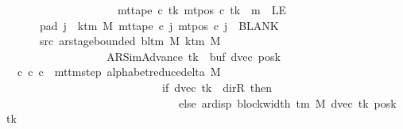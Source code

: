 \begin{isabellebody}
\ \ \ \ \ \ \ \ \ \ \ \ \ \ \ \ \ \ \ \ {\isasymLongrightarrow}\ mt{\isacharunderscore}{\kern0pt}tape\ c{}\ tk\ {\isacharparenleft}{\kern0pt}mt{\isacharunderscore}{\kern0pt}pos\ c{}\ tk\ {\isacharminus}{\kern0pt}\ m{\isacharparenright}{\kern0pt}\ {\isasymnoteq}\ LE{}{\isachardoublequoteclose}\isanewline
\ \ \ \ \ \ \ pad{}{\isacharcolon}{\kern0pt}\ {\isachardoublequoteopen}{\isasymforall}j\ {\isasymge}\ k{\isacharunderscore}{\kern0pt}tm\ M{\isachardot}{\kern0pt}\ mt{\isacharunderscore}{\kern0pt}tape\ c{}\ j\ {\isacharparenleft}{\kern0pt}mt{\isacharunderscore}{\kern0pt}pos\ c{}\ j{\isacharparenright}{\kern0pt}\ {\isacharequal}{\kern0pt}\ BLANK{}{\isachardoublequoteclose}\isanewline
\ \ \ \ \ \ \ src{}{\isacharcolon}{\kern0pt}\ {\isachardoublequoteopen}ar{\isacharunderscore}{\kern0pt}stage{\isacharunderscore}{\kern0pt}bounded\ {\isacharparenleft}{\kern0pt}bl{\isacharunderscore}{\kern0pt}tm\ M{\isacharparenright}{\kern0pt}\ {\isacharparenleft}{\kern0pt}k{\isacharunderscore}{\kern0pt}tm\ M{\isacharparenright}{\kern0pt}\isanewline
\ \ \ \ \ \ \ \ \ \ \ \ \ \ \ \ \ \ \ {\isacharparenleft}{\kern0pt}AR{\isacharunderscore}{\kern0pt}SimAdvance{\isacharcomma}{\kern0pt}\ tk{\isacharcomma}{\kern0pt}\ {}{\isacharcomma}{\kern0pt}\ buf{\isacharcomma}{\kern0pt}\ dvec{\isacharcomma}{\kern0pt}\ posk{\isacharparenright}{\kern0pt}{\isachardoublequoteclose}\isanewline
\ \ \ {\isachardoublequoteopen}{\isasymexists}c{\isacharprime}{\kern0pt}{\isachardot}{\kern0pt}\ {\isacharparenleft}{\kern0pt}c{}{\isacharcomma}{\kern0pt}\ c{\isacharprime}{\kern0pt}{\isacharparenright}{\kern0pt}\ {\isasymin}\ {\isacharparenleft}{\kern0pt}mttm{\isacharunderscore}{\kern0pt}step\ {\isacharparenleft}{\kern0pt}alphabet{\isacharunderscore}{\kern0pt}reduce{\isacharunderscore}{\kern0pt}delta\ M{\isacharparenright}{\kern0pt}{\isacharparenright}{\kern0pt}\isanewline
\ \ \ \ \ \ \ \ \ \ \ \ \ \ \ \ \ \ \ \ \ \ \ \ \ \ \ \ {\isacharcircum}{\kern0pt}{\isacharcircum}{\kern0pt}\ {\isacharparenleft}{\kern0pt}if\ dvec\ tk\ {\isacharequal}{\kern0pt}\ dir{\isachardot}{\kern0pt}R\ then\ {}\isanewline
\ \ \ \ \ \ \ \ \ \ \ \ \ \ \ \ \ \ \ \ \ \ \ \ \ \ \ \ \ \ \ \ else\ ar{\isacharunderscore}{\kern0pt}disp\ {\isacharparenleft}{\kern0pt}block{\isacharunderscore}{\kern0pt}width\ {\isacharparenleft}{\kern0pt}{\isasymGamma}{\isacharunderscore}{\kern0pt}tm\ M{\isacharparenright}{\kern0pt}{\isacharparenright}{\kern0pt}\ {\isacharparenleft}{\kern0pt}dvec\ tk{\isacharparenright}{\kern0pt}\ {\isacharparenleft}{\kern0pt}posk\ tk{\isacharparenright}{\kern0pt}{\isacharparenright}{\kern0pt}\isanewline

\end{isabellebody}
